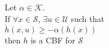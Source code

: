 \documentclass[preview]{standalone}
\begin{document}
\begin{center}
Let $\alpha \in \mathcal{K}$.\\If $\forall x \in \mathcal{S}$, $\exists u \in \mathcal{U}$ such that \\$\dot h(x, u) \geq - \alpha(h(x))$ \\then $h$ is a CBF for $\mathcal{S}$
\end{center}
\end{document}
